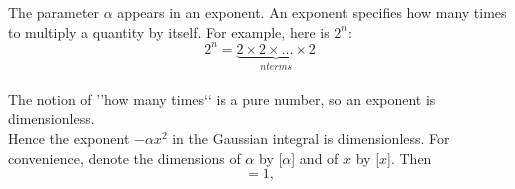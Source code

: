 \documentclass[a4paper]{article}
\numberwithin{equation}{section}
\begin{document}
The parameter $\alpha$ appears in an exponent. An exponent specifies how
many times to multiply a quantity by itself. For example, here is $2^{n}$:
\\

\begin{equation}
2^{n}=\underbrace{2 \times 2 \times... \times 2}_{n  terms}
\end{equation}
\\

The notion of ’’how many times‘‘ is a pure number, so an exponent is
dimensionless.
\\

Hence the exponent −$\alpha x^{2}$ in the Gaussian integral is dimensionless. For
convenience, denote the dimensions of $\alpha$ by [$\alpha$] and of $x$ by [$x$]. Then
\\
\begin{equation}
[\alpha][x^{2}]=1,
\end{equation}
\end{document}
